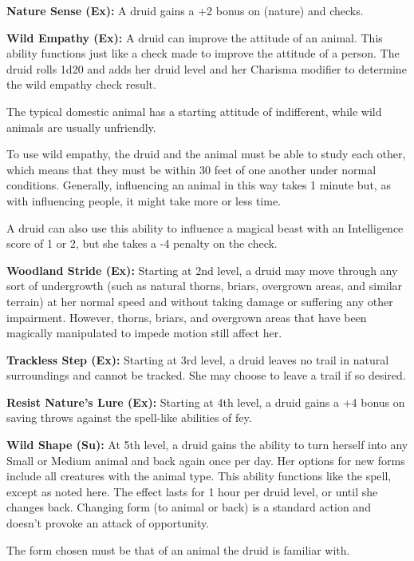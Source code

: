 \textbf{Nature Sense (Ex):} A druid gains a +2 bonus on  (nature) and 
 checks.

\textbf{Wild Empathy (Ex):} A druid can improve the attitude of an animal. This 
ability functions just like a  check made to improve the attitude of a 
person. The druid rolls 1d20 and adds her druid level and her Charisma modifier 
to determine the wild empathy check result.

The typical domestic animal has a starting attitude of indifferent, while wild 
animals are usually unfriendly.

To use wild empathy, the druid and the animal must be able to study each other, 
which means that they must be within 30 feet of one another under normal conditions. 
Generally, influencing an animal in this way takes 1 minute but, as with influencing 
people, it might take more or less time.

A druid can also use this ability to influence a magical beast with an Intelligence 
score of 1 or 2, but she takes a -4 penalty on the check.

\textbf{Woodland Stride (Ex):} Starting at 2nd level, a druid may move through 
any sort of undergrowth (such as natural thorns, briars, overgrown areas, and similar 
terrain) at her normal speed and without taking damage or suffering any other impairment. 
However, thorns, briars, and overgrown areas that have been magically manipulated 
to impede motion still affect her.

\textbf{Trackless Step (Ex):} Starting at 3rd level, a druid leaves no trail in 
natural surroundings and cannot be tracked. She may choose to leave a trail if 
so desired.

\textbf{Resist Nature's Lure (Ex):} Starting at 4th level, a druid gains a +4 bonus 
on saving throws against the spell-like abilities of fey.

\textbf{Wild Shape (Su):} At 5th level, a druid gains the ability to turn herself 
into any Small or Medium animal and back again once per day. Her options for new 
forms include all creatures with the animal type. This ability functions like the 
 spell, except as noted here. The effect lasts for 1 hour per 
druid level, or until she changes back. Changing form (to animal or back) is a 
standard action and doesn't provoke an attack of opportunity.

The form chosen must be that of an animal the druid is familiar with. 

